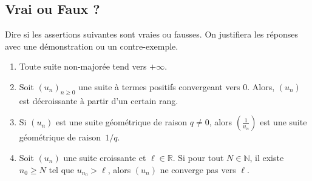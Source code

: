 \vspace{1em}

\subsection{Vrai ou Faux ?}
  Dire si les assertions suivantes sont vraies ou fausses. On justifiera les réponses avec une démonstration ou un contre-exemple.
  \begin{enumerate}[label = $\square$, itemsep = 0.5em]
    \item Toute suite non-majorée tend vers $+\infty$.

    \item Soit $\left(u_n\right)_{n \geq 0}$ une suite à termes positifs convergeant vers $0$. Alors, $(u_n)$ est décroissante à partir d'un certain rang.

    \item Si $(u_n)$ est une suite géométrique de raison $q \neq 0$, alors $\left(\frac{1}{u_n}\right)$ est une suite géométrique de raison~$1/q$.

    \item Soit $(u_n)$ une suite croissante et $\ell \in \mathbb{R}$. Si pour tout $N \in \mathbb{N}$, il existe $n_0 \geq N$ tel que $u_{n_0} > \ell$, alors $(u_n)$ ne converge pas vers $\ell$.


\end{enumerate}
